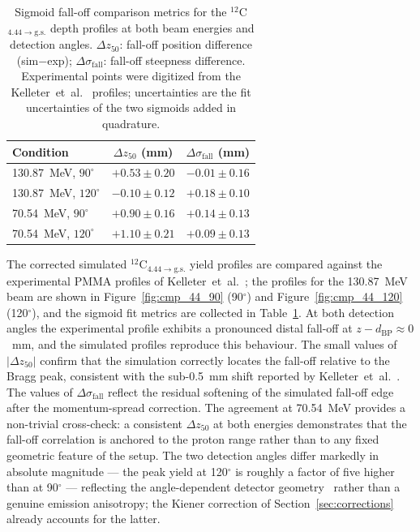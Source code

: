 \documentclass[a4paper]{article}
\begin{document}
\begin{table}[h]
\centering
\caption{Sigmoid fall-off comparison metrics for the $^{12}$C$_{4.44\to\mathrm{g.s.}}$ depth profiles at both beam energies and detection angles. $\Delta z_{50}$: fall-off position difference (sim$-$exp); $\Delta\sigma_\mathrm{fall}$: fall-off steepness difference. Experimental points were digitized from the Kelleter~et~al.~\cite{kelleter2017} profiles; uncertainties are the fit uncertainties of the two sigmoids added in quadrature.}
\label{tab:metrics}
\begin{tabular}{lcc}
\toprule
Condition & $\Delta z_{50}$ (mm) & $\Delta\sigma_\mathrm{fall}$ (mm) \\
\midrule
130.87~MeV, $90^\circ$  & $+0.53 \pm 0.20$ & $-0.01 \pm 0.16$ \\
130.87~MeV, $120^\circ$ & $-0.10 \pm 0.12$ & $+0.18 \pm 0.10$ \\
70.54~MeV,  $90^\circ$  & $+0.90 \pm 0.16$ & $+0.14 \pm 0.13$ \\
70.54~MeV,  $120^\circ$ & $+1.10 \pm 0.21$ & $+0.09 \pm 0.13$ \\
\bottomrule
\end{tabular}
\end{table}

The corrected simulated $^{12}$C$_{4.44\to\mathrm{g.s.}}$ yield profiles are compared against the experimental PMMA profiles of Kelleter~et~al.~\cite{kelleter2017}; the profiles for the 130.87~MeV beam are shown in Figure~\ref{fig:cmp_44_90} (90$^\circ$) and Figure~\ref{fig:cmp_44_120} (120$^\circ$), and the sigmoid fit metrics are collected in Table~\ref{tab:metrics}. At both detection angles the experimental profile exhibits a pronounced distal fall-off at $z - d_\mathrm{BP} \approx 0$~mm, and the simulated profiles reproduce this behaviour. The small values of $|\Delta z_{50}|$ confirm that the simulation correctly locates the fall-off relative to the Bragg peak, consistent with the sub-0.5~mm shift reported by Kelleter~et~al.~\cite{kelleter2017}. The values of $\Delta\sigma_\mathrm{fall}$ reflect the residual softening of the simulated fall-off edge after the momentum-spread correction. The agreement at 70.54~MeV provides a non-trivial cross-check: a consistent $\Delta z_{50}$ at both energies demonstrates that the fall-off correlation is anchored to the proton range rather than to any fixed geometric feature of the setup. The two detection angles differ markedly in absolute magnitude — the peak yield at 120$^\circ$ is roughly a factor of five higher than at 90$^\circ$ — reflecting the angle-dependent detector geometry~\cite{kelleter2017} rather than a genuine emission anisotropy; the Kiener correction of Section~\ref{sec:corrections} already accounts for the latter.
\end{document}
